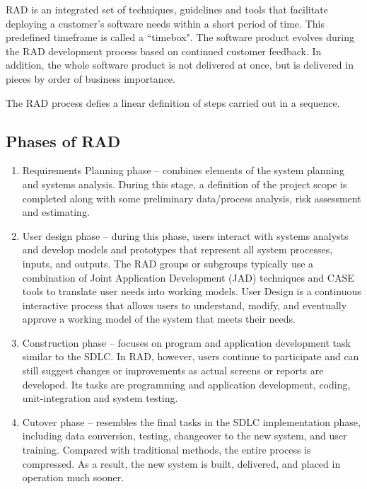 RAD is an integrated set of techniques, guidelines and tools that facilitate deploying a customer's software needs within a short period of time. This predefined timeframe is called a ``timebox". The software product evolves during the RAD development process based on continued customer feedback. In addition, the whole software product is not delivered at once, but is delivered in pieces by order of business importance. \cite{gottesdiener}


The RAD process defies a linear definition of steps carried out in a sequence. \cite{gottesdiener}

\subsection{Phases of RAD}

\begin{enumerate}
\item Requirements Planning phase -- combines elements of the system planning and systems analysis. During this stage, a definition of the project scope is completed along with some preliminary data/process analysis, risk assessment and estimating.

\item User design phase -- during this phase, users interact with systems analysts and develop models and prototypes that represent all system processes, inputs, and outputs. The RAD groups or subgroups typically use a combination of Joint Application Development (JAD) techniques and CASE tools to translate user needs into working models. User Design is a continuous interactive process that allows users to understand, modify, and eventually approve a working model of the system that meets their needs.

\item Construction phase -- focuses on program and application development task similar to the SDLC. In RAD, however, users continue to participate and can still suggest changes or improvements as actual screens or reports are developed. Its tasks are programming and application development, coding, unit-integration and system testing.

\item Cutover phase -- resembles the final tasks in the SDLC implementation phase, including data conversion, testing, changeover to the new system, and user training. Compared with traditional methods, the entire process is compressed. As a result, the new system is built, delivered, and placed in operation much sooner.
\end{enumerate}

